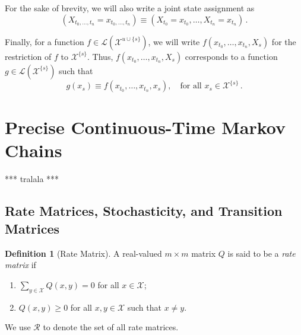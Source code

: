 \documentclass[10pt]{paper}
\theoremstyle{definition}
\newtheorem{definition}{Definition}
\newcommand{\states}{\mathcal{X}}
\newcommand{\gambles}{\mathcal{L}}
\newcommand{\gamblesX}{\gambles(\states)}
\begin{document}
For the sake of brevity, we will also write a joint state assignment as
\begin{equation*}
\left(X_{t_0,\ldots,t_n}=x_{t_0,\ldots,t_n}\right)\equiv (X_{t_0}=x_{t_0},\ldots,X_{t_n}=x_{t_n})\,.
\end{equation*}

Finally, for a function $f\in\gambles(\states^{u\cup\{s\}})$, we will write $f(x_{t_0},\ldots,x_{t_n},X_s)$ for the restriction of $f$ to $\states^{\{s\}}$. Thus, $f(x_{t_0},\ldots,x_{t_n},X_s)$ corresponds to a function $g\in\gambles(\states^{\{s\}})$ such that
\begin{equation*}
g(x_s) \equiv f(x_{t_0},\ldots,x_{t_n},x_s),\quad\text{for all $x_s\in\states^{\{s\}}$}\,.
\end{equation*}


\section{Precise Continuous-Time Markov Chains}

*** tralala ***

\subsection{Rate Matrices, Stochasticity, and Transition Matrices}

\begin{definition}[Rate Matrix]\label{def:rate_matrix}
A real-valued $m\times m$ matrix $Q$ is said to be a \emph{rate matrix} if

\vspace{5pt}
\begin{enumerate}[label=R\arabic*:]
\item
$\sum_{y\in\states}Q(x,y)=0$ for all $x\in\states$;
\item
$Q(x,y)\geq0$ for all $x,y\in\states$ such that $x\neq y$.
\end{enumerate}
\vspace{5pt}
\noindent
We use $\mathcal{R}$ to denote the set of all rate matrices. 
\end{definition}
\end{document}
